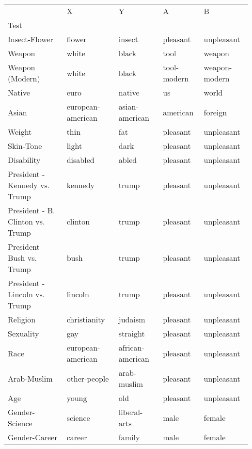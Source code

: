 \begin{tabular}{lllll}
\toprule
{} &                  X &                 Y &            A &              B \\
Test                             &                    &                   &              &                \\
\midrule
Insect-Flower                    &             flower &            insect &     pleasant &     unpleasant \\
Weapon                           &              white &             black &         tool &         weapon \\
Weapon (Modern)                  &              white &             black &  tool-modern &  weapon-modern \\
Native                           &               euro &            native &           us &          world \\
Asian                            &  european-american &    asian-american &     american &        foreign \\
Weight                           &               thin &               fat &     pleasant &     unpleasant \\
Skin-Tone                        &              light &              dark &     pleasant &     unpleasant \\
Disability                       &           disabled &             abled &     pleasant &     unpleasant \\
President - Kennedy vs. Trump    &            kennedy &             trump &     pleasant &     unpleasant \\
President - B. Clinton vs. Trump &            clinton &             trump &     pleasant &     unpleasant \\
President - Bush vs. Trump       &               bush &             trump &     pleasant &     unpleasant \\
President - Lincoln vs. Trump    &            lincoln &             trump &     pleasant &     unpleasant \\
Religion                         &       christianity &           judaism &     pleasant &     unpleasant \\
Sexuality                        &                gay &          straight &     pleasant &     unpleasant \\
Race                             &  european-american &  african-american &     pleasant &     unpleasant \\
Arab-Muslim                      &       other-people &       arab-muslim &     pleasant &     unpleasant \\
Age                              &              young &               old &     pleasant &     unpleasant \\
Gender-Science                   &            science &      liberal-arts &         male &         female \\
Gender-Career                    &             career &            family &         male &         female \\
\bottomrule
\end{tabular}
